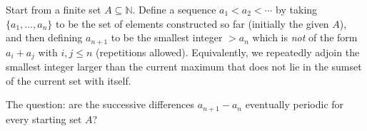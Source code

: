 Start from a finite set $A\subseteq\mathbb{N}$. Define a sequence $a_1<a_2<\cdots$ by taking $\{a_1,\dots,a_n\}$ to be the set of elements constructed so far (initially the given $A$), and then defining $a_{n+1}$ to be the smallest integer $>a_n$ which is \emph{not} of the form $a_i+a_j$ with $i,j\le n$ (repetitions allowed).
Equivalently, we repeatedly adjoin the smallest integer larger than the current maximum that does not lie in the sumset of the current set with itself.

The question: are the successive differences $a_{n+1}-a_n$ eventually periodic for every starting set $A$?
